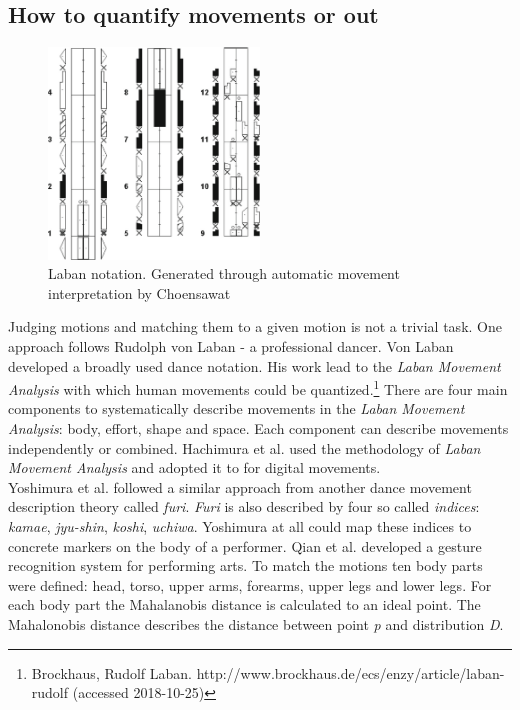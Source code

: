 
\subsection{How to quantify movements \todo or out}
\begin{figure}
	\centering
	\includegraphics[width=0.5\textwidth]{img/laban.png}
	\caption{Laban notation. Generated through automatic movement interpretation by Choensawat \cite{Choensawat2015}}
	\label{fig:movements_cont}
\end{figure}
Judging motions and matching them to a given motion is not a trivial task. One approach follows Rudolph von Laban - a professional dancer. Von Laban developed a broadly used dance notation. His work lead to the \textit{Laban Movement Analysis} with which human movements could be quantized.\footnote{Brockhaus, Rudolf Laban. http://www.brockhaus.de/ecs/enzy/article/laban-rudolf (accessed 2018-10-25)} There are four main components to systematically describe movements in the \textit{Laban Movement Analysis}: body, effort, shape and space. Each component can describe movements independently or combined. Hachimura et al. \cite{Hachimura2005} used the methodology  of \textit{Laban Movement Analysis} and adopted it to for digital movements.\\
Yoshimura et al. \cite{Yoshimura2005} followed a similar approach from another dance movement description theory called \textit{furi}. \textit{Furi} is also described by four so called \textit{indices}: \textit{kamae}, \textit{jyu-shin}, \textit{koshi}, \textit{uchiwa}. Yoshimura at all could map these indices to concrete markers on the body of a performer.
Qian et al. \cite{GangQian2005} developed a gesture recognition system for performing arts. To match the motions ten body parts were defined: head, torso, upper arms, forearms, upper legs and lower legs. For each body part the Mahalanobis distance is calculated to an ideal point. The Mahalonobis distance describes the distance between point \textit{p} and distribution \textit{D}. 

